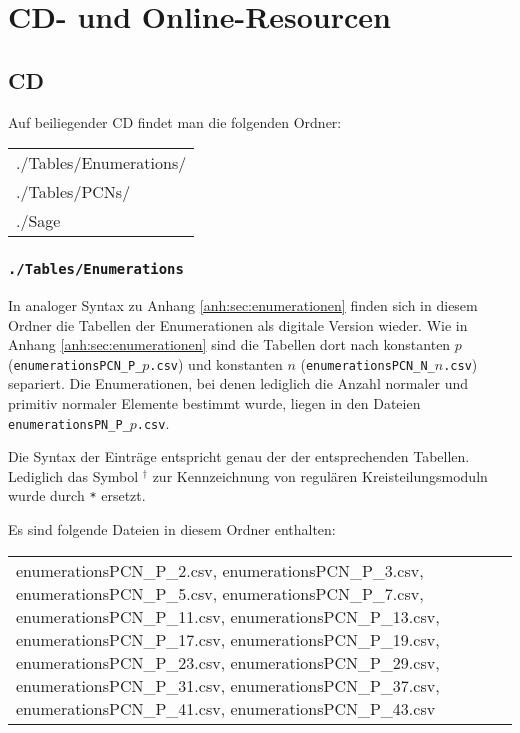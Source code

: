 \chapter{CD- und Online-Resourcen}
\newcommand{\normalcomma}{{\normalfont ,} }

\section{CD}
\label{anh:sec:cd}
Auf beiliegender CD findet man die folgenden Ordner:

\begin{tabular}{>{\ttfamily}l}
  ./Tables/Enumerations/ \\
  ./Tables/PCNs/ \\
  ./Sage
\end{tabular}

\subsection{\texttt{./Tables/Enumerations}}

In analoger Syntax zu Anhang \ref{anh:sec:enumerationen} finden sich in diesem
Ordner die Tabellen der Enumerationen als digitale Version wieder.
Wie in Anhang \ref{anh:sec:enumerationen} sind die Tabellen dort nach konstanten
$p$ (\texttt{enumerationsPCN\_P\_$p$.csv}) und konstanten $n$ 
(\texttt{enumerationsPCN\_N\_$n$.csv}) separiert. Die Enumerationen, bei denen
lediglich die Anzahl normaler und primitiv normaler Elemente bestimmt wurde,
liegen in den Dateien \texttt{enumerationsPN\_P\_$p$.csv}.

Die Syntax der Einträge entspricht genau der der entsprechenden 
Tabellen. Lediglich das Symbol $^\dagger$ zur Kennzeichnung von regulären
Kreisteilungsmoduln wurde durch \texttt{*} ersetzt.

Es sind folgende Dateien in diesem Ordner enthalten:

\begin{tabular}{>{\small\ttfamily}p{\textwidth}}
enumerationsPCN\_P\_2.csv\normalcomma
enumerationsPCN\_P\_3.csv\normalcomma
enumerationsPCN\_P\_5.csv\normalcomma
enumerationsPCN\_P\_7.csv\normalcomma
enumerationsPCN\_P\_11.csv\normalcomma
enumerationsPCN\_P\_13.csv\normalcomma
enumerationsPCN\_P\_17.csv\normalcomma
enumerationsPCN\_P\_19.csv\normalcomma
enumerationsPCN\_P\_23.csv\normalcomma
enumerationsPCN\_P\_29.csv\normalcomma
enumerationsPCN\_P\_31.csv\normalcomma
enumerationsPCN\_P\_37.csv\normalcomma
enumerationsPCN\_P\_41.csv\normalcomma
enumerationsPCN\_P\_43.csv
\end{tabular}

